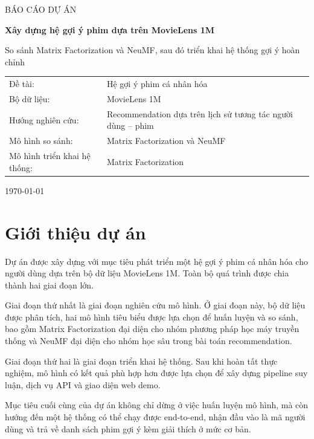 \documentclass[12pt,a4paper]{article}
\begin{document}
\begin{titlepage}
    \centering
    {\Large BÁO CÁO DỰ ÁN \par}
    \vspace{1cm}
    {\LARGE\bfseries Xây dựng hệ gợi ý phim dựa trên MovieLens 1M\par}
    \vspace{0.5cm}
    {\Large So sánh Matrix Factorization và NeuMF, sau đó triển khai hệ thống gợi ý hoàn chỉnh\par}
    \vspace{2cm}

    \begin{tabular}{>{\raggedright\arraybackslash}p{5cm} p{8.5cm}}
        Đề tài: & Hệ gợi ý phim cá nhân hóa \\
        Bộ dữ liệu: & MovieLens 1M \\
        Hướng nghiên cứu: & Recommendation dựa trên lịch sử tương tác người dùng -- phim \\
        Mô hình so sánh: & Matrix Factorization và NeuMF \\
        Mô hình triển khai hệ thống: & Matrix Factorization \\
    \end{tabular}

    \vfill
    {\large \today \par}
\end{titlepage}

\tableofcontents
\newpage

\section{Giới thiệu dự án}

Dự án được xây dựng với mục tiêu phát triển một hệ gợi ý phim cá nhân hóa cho người dùng dựa trên bộ dữ liệu MovieLens 1M. Toàn bộ quá trình được chia thành hai giai đoạn lớn.

Giai đoạn thứ nhất là giai đoạn nghiên cứu mô hình. Ở giai đoạn này, bộ dữ liệu được phân tích, hai mô hình tiêu biểu được lựa chọn để huấn luyện và so sánh, bao gồm Matrix Factorization đại diện cho nhóm phương pháp học máy truyền thống và NeuMF đại diện cho nhóm học sâu trong bài toán recommendation.

Giai đoạn thứ hai là giai đoạn triển khai hệ thống. Sau khi hoàn tất thực nghiệm, mô hình có kết quả phù hợp hơn được lựa chọn để xây dựng pipeline suy luận, dịch vụ API và giao diện web demo.

Mục tiêu cuối cùng của dự án không chỉ dừng ở việc huấn luyện mô hình, mà còn hướng đến một hệ thống có thể chạy được end-to-end, nhận đầu vào là mã người dùng và trả về danh sách phim gợi ý kèm giải thích ở mức cơ bản.
\end{document}
